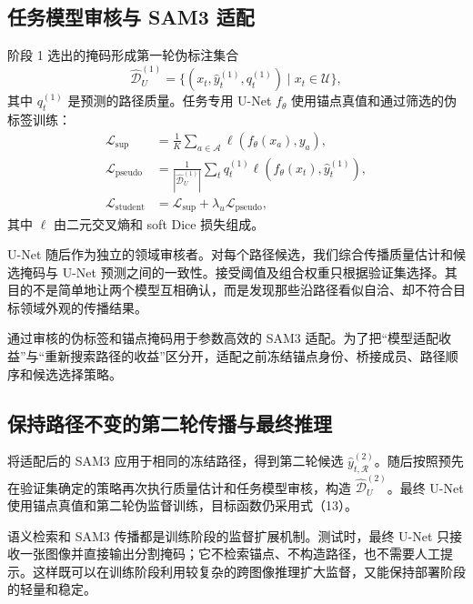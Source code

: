 \documentclass[UTF8,a4paper,10pt]{ctexart}
\begin{document}
\subsection{任务模型审核与 SAM3 适配}
\label{sec:collaboration-zh}

阶段 1 选出的掩码形成第一轮伪标注集合
\begin{equation}
\widehat{\mathcal{D}}_{U}^{(1)}=
\{(x_t,\hat{y}_t^{(1)},q_t^{(1)})\mid x_t\in\mathcal{U}\},
\end{equation}
其中 $q_t^{(1)}$ 是预测的路径质量。任务专用 U-Net $f_{\theta}$ 使用锚点真值和通过筛选的伪标签训练：
\begin{equation}
\begin{aligned}
\mathcal{L}_{\mathrm{sup}}&=\frac{1}{K}\sum_{a\in\mathcal{A}}
\ell(f_{\theta}(x_a),y_a),\\
\mathcal{L}_{\mathrm{pseudo}}&=\frac{1}{|\widehat{\mathcal{D}}_{U}^{(1)}|}
\sum_t q_t^{(1)}\ell(f_{\theta}(x_t),\hat{y}_t^{(1)}),\\
\mathcal{L}_{\mathrm{student}}&=\mathcal{L}_{\mathrm{sup}}
+\lambda_u\mathcal{L}_{\mathrm{pseudo}},
\end{aligned}
\end{equation}
其中 $\ell$ 由二元交叉熵和 soft Dice 损失组成。

U-Net 随后作为独立的领域审核者。对每个路径候选，我们综合传播质量估计和候选掩码与 U-Net 预测之间的一致性。接受阈值及组合权重只根据验证集选择。其目的不是简单地让两个模型互相确认，而是发现那些沿路径看似自洽、却不符合目标领域外观的传播结果。

通过审核的伪标签和锚点掩码用于参数高效的 SAM3 适配。为了把“模型适配收益”与“重新搜索路径的收益”区分开，适配之前冻结锚点身份、桥接成员、路径顺序和候选选择策略。


\subsection{保持路径不变的第二轮传播与最终推理}
\label{sec:repropagation-zh}

将适配后的 SAM3 应用于相同的冻结路径，得到第二轮候选 $\hat{y}_{t,\mathcal{R}}^{(2)}$。随后按照预先在验证集确定的策略再次执行质量估计和任务模型审核，构造 $\widehat{\mathcal{D}}_{U}^{(2)}$。最终 U-Net 使用锚点真值和第二轮伪监督训练，目标函数仍采用式（13）。

语义检索和 SAM3 传播都是训练阶段的监督扩展机制。测试时，最终 U-Net 只接收一张图像并直接输出分割掩码；它不检索锚点、不构造路径，也不需要人工提示。这样既可以在训练阶段利用较复杂的跨图像推理扩大监督，又能保持部署阶段的轻量和稳定。



\end{document}
